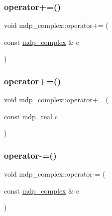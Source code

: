 \mbox{\label{classmdp__complex_a082aab81b5bc1b42e1ad09bd0f52d710}} 
\subsubsection{\texorpdfstring{operator+=()}{operator+=()}\hspace{0.1cm}{\footnotesize\ttfamily [1/2]}}
{\footnotesize\ttfamily void mdp\+\_\+complex\+::operator+= (\begin{DoxyParamCaption}\item[{const \hyperlink{classmdp__complex}{mdp\+\_\+complex} \&}]{c }\end{DoxyParamCaption})\hspace{0.3cm}{\ttfamily [inline]}}

\mbox{\label{classmdp__complex_aead1214077dc876c3f674e5fcd9717a5}} 
\subsubsection{\texorpdfstring{operator+=()}{operator+=()}\hspace{0.1cm}{\footnotesize\ttfamily [2/2]}}
{\footnotesize\ttfamily void mdp\+\_\+complex\+::operator+= (\begin{DoxyParamCaption}\item[{const \hyperlink{mdp__global__vars_8h_a69d96b74c791e0bbdb888b3913a69450}{mdp\+\_\+real}}]{c }\end{DoxyParamCaption})\hspace{0.3cm}{\ttfamily [inline]}}

\mbox{\label{classmdp__complex_a1eac5dee207c0bb4cfafa7f02311e819}} 
\subsubsection{\texorpdfstring{operator-\/=()}{operator-=()}\hspace{0.1cm}{\footnotesize\ttfamily [1/2]}}
{\footnotesize\ttfamily void mdp\+\_\+complex\+::operator-\/= (\begin{DoxyParamCaption}\item[{const \hyperlink{classmdp__complex}{mdp\+\_\+complex} \&}]{c }\end{DoxyParamCaption})\hspace{0.3cm}{\ttfamily [inline]}}

